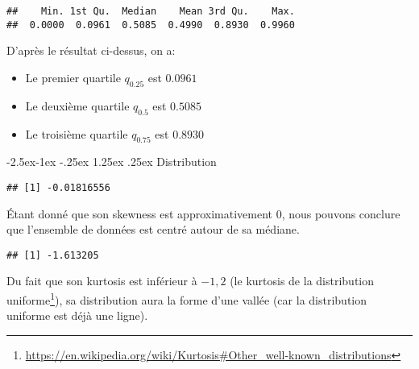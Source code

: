 \documentclass[
  12pt,
]{article}
\makeatletter
\newenvironment{Shaded}{\begin{snugshade}}{\end{snugshade}}
\newcommand{\FunctionTok}[1]{\textcolor[rgb]{0.00,0.00,0.00}{#1}}
\newcommand{\NormalTok}[1]{#1}
\newcommand{\SpecialCharTok}[1]{\textcolor[rgb]{0.00,0.00,0.00}{#1}}
\providecommand{\tightlist}{%
  \setlength{\itemsep}{0pt}\setlength{\parskip}{0pt}}
\renewcommand\paragraph{\@startsection{paragraph}{4}{\z@}%
        {-2.5ex\@plus -1ex \@minus -.25ex}%
        {1.25ex \@plus .25ex}%
        {\normalfont\normalsize\bfseries}}
\makeatother
\begin{document}
\begin{verbatim}
##    Min. 1st Qu.  Median    Mean 3rd Qu.    Max. 
##  0.0000  0.0961  0.5085  0.4990  0.8930  0.9960
\end{verbatim}

D'après le résultat ci-dessus, on a:

\begin{itemize}
\tightlist
\item
  Le premier quartile \(q_{0.25}\) est \(0.0961\)
\item
  Le deuxième quartile \(q_{0.5}\) est \(0.5085\)
\item
  Le troisième quartile \(q_{0.75}\) est \(0.8930\)
\end{itemize}

\hypertarget{distribution}{%
\paragraph{Distribution}\label{distribution}}

\begin{Shaded}
\end{Shaded}

\begin{verbatim}
## [1] -0.01816556
\end{verbatim}

Étant donné que son skewness est approximativement 0, nous pouvons
conclure que l'ensemble de données est centré autour de sa médiane.

\begin{Shaded}
\end{Shaded}

\begin{verbatim}
## [1] -1.613205
\end{verbatim}

Du fait que son kurtosis est inférieur à \(-1,2\) (le kurtosis de la
distribution uniforme\footnote{\url{https://en.wikipedia.org/wiki/Kurtosis\#Other_well-known_distributions}}),
sa distribution aura la forme d'une vallée (car la distribution uniforme
est déjà une ligne).
\end{document}
